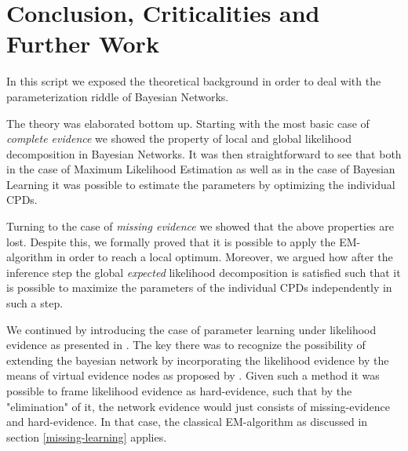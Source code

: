 \documentclass[11pt]{article}
\begin{document}
\begin{article}
\begin{algorithm*}[h!]
\begin{multicols}{2}
\begin{algorithmic}[1]
{\EndWhile
\EndProcedure

\end{algorithmic}
\end{multicols}
\end{algorithm*}

\cleardoublepage

\section{Conclusion, Criticalities and Further Work}
\label{conclusion}
In this script we exposed the theoretical background in order
to deal with the parameterization riddle of Bayesian Networks.

The theory was elaborated bottom up. Starting with the most basic
case of \emph{complete evidence} we showed the property of local and
global likelihood decomposition in Bayesian Networks. It was then
straightforward to see that both in the case of Maximum Likelihood
Estimation as well as in the case of Bayesian Learning it was
possible to estimate the parameters by optimizing the individual
CPDs.

Turning to the case of \emph{missing evidence} we showed that the above
properties are lost. Despite this, we formally proved that it is
possible to apply the EM-algorithm in order to reach a local
optimum. Moreover, we argued how after the inference step the global
\emph{expected} likelihood decomposition is satisfied such that it is
possible to maximize the parameters of the individual CPDs
independently in such a step.

We continued by introducing the case of parameter learning under
likelihood evidence as presented in \cite{Wasserkrug_all}. The key
there was to recognize the possibility of extending the bayesian
network by incorporating the likelihood evidence by the means of
virtual evidence nodes as proposed by
\cite{pearl1987evidential}. Given such a method it was possible to
frame likelihood evidence as hard-evidence, such that by the
"elimination" of it, the network evidence would just consists of
missing-evidence and hard-evidence. In that case, the classical
EM-algorithm as discussed in section \ref{missing-learning} applies.


\end{article}
\end{document}
